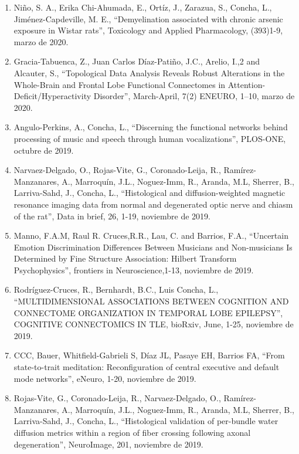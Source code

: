 \begin{enumerate}
\item Niño, S. A., Erika Chi-Ahumada, E., Ortíz, J., Zarazua, S., Concha, L., Jiménez-Capdeville, M. E., “Demyelination 
associated with chronic arsenic exposure in Wistar rats”, Toxicology and Applied Pharmacology, (393)1-9,  marzo de 2020.

\item Gracia-Tabuenca, Z., Juan Carlos Díaz-Patiño, J.C., Arelio, I.,2 and Alcauter, S., “Topological Data Analysis Reveals 
Robust Alterations in the Whole-Brain and Frontal Lobe Functional Connectomes in Attention-Deficit/Hyperactivity Disorder”, 
March-April, 7(2) ENEURO, 1–10,    marzo de 2020.

\item Angulo-Perkins, A., Concha, L., “Discerning the functional networks behind processing of music and speech through human 
vocalizations”, PLOS-ONE,    octubre de 2019.

\item Narvaez-Delgado, O., Rojas-Vite, G., Coronado-Leija, R., Ramírez-Manzanares, A., Marroquín, J.L., Noguez-Imm, R., 
Aranda, 
M.L, Sherrer, B., Larriva-Sahd, J., Concha, L., “Histological and diffusion-weighted magnetic resonance imaging data from 
normal and degenerated optic nerve and chiasm of the rat”, Data in brief, 26, 1-19,    
noviembre de 2019.

\item Manno, F.A.M, Raul R. Cruces,R.R., Lau, C. and Barrios, F.A., “Uncertain Emotion Discrimination Differences Between 
Musicians and Non-musicians Is Determined by Fine Structure Association: Hilbert Transform Psychophysics”, frontiers in 
Neuroscience,1-13,    noviembre de 2019.

\item Rodríguez-Cruces, R., Bernhardt, B.C., Luis Concha, L., “MULTIDIMENSIONAL ASSOCIATIONS BETWEEN COGNITION AND CONNECTOME 
ORGANIZATION IN TEMPORAL LOBE EPILEPSY”, COGNITIVE CONNECTOMICS IN TLE, bioRxiv, June, 1-25, noviembre de 2019.

\item CCC, Bauer, Whitfield-Gabrieli S, Díaz JL, Pasaye EH, Barrios FA, “From state-to-trait meditation: Reconfiguration of 
central executive and default mode networks”, eNeuro, 1-20,    noviembre de 2019.

\item Rojas-Vite, G., Coronado-Leija, R., Narvaez-Delgado, O., Ramírez-Manzanares, A., Marroquín, J.L., Noguez-Imm, R., 
Aranda, 
M.L, Sherrer, B., Larriva-Sahd, J., Concha, L., “Histological validation of per-bundle water diffusion metrics within a 
region of fiber crossing following axonal degeneration”,
NeuroImage, 201,    noviembre de 2019.


\end{enumerate}
